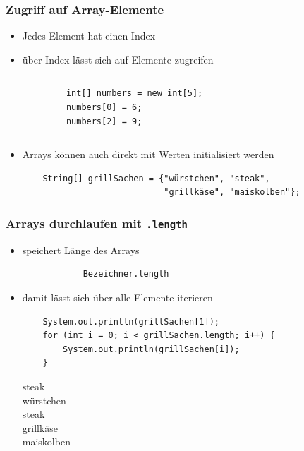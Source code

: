 \documentclass{../../presentation}
\begin{document}
\begin{frame}[fragile]
	\frametitle{Zugriff auf Array-Elemente}
	\begin{itemize}
		\item\pause Jedes Element hat einen Index
		\item\pause über Index lässt sich auf Elemente zugreifen
	\end{itemize}
	\begin{columns}
		\begin{verbatim}
            int[] numbers = new int[5];
            numbers[0] = 6;
            numbers[2] = 9;
        \end{verbatim}

		\begin{center}
		\end{center}
	\end{columns}

	\vspace{0.5cm}
	\begin{itemize}
		\item\pause Arrays können auch direkt mit Werten initialisiert werden
		      \begin{verbatim}
    String[] grillSachen = {"würstchen", "steak", 
                            "grillkäse", "maiskolben"};
    \end{verbatim}
	\end{itemize}
\end{frame}

\begin{frame}[fragile]
	\frametitle{Arrays durchlaufen mit \texttt{.length}}
	\begin{itemize}
		\item\pause speichert Länge des Arrays
		      \begin{verbatim}
			Bezeichner.length
		\end{verbatim}
		\item\pause damit lässt sich über alle Elemente iterieren
		      \begin{verbatim}
    System.out.println(grillSachen[1]);
    for (int i = 0; i < grillSachen.length; i++) {
        System.out.println(grillSachen[i]);
    }
    \end{verbatim}
		      \begin{ausgabe}
			      steak \\
			      würstchen \\
			      steak \\
			      grillkäse \\
			      maiskolben
		      \end{ausgabe}
	\end{itemize}
\end{frame}


\end{document}
